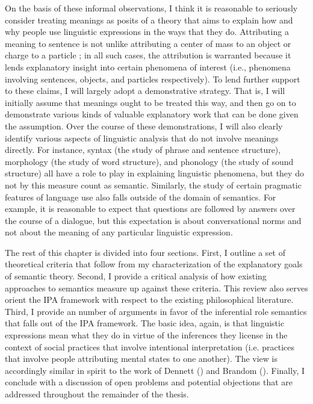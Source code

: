 On the basis of these informal observations, I think it is reasonable to seriously consider treating meanings as posits of a theory that aims to explain how and why people use linguistic expressions in the ways that they do. Attributing a meaning to sentence is not unlike attributing a center of mass to an object or charge to a particle \citep[see][]{Dennett:1987}; in all such cases, the attribution is warranted because it lends explanatory insight into certain phenomena of interest (i.e., phenomena involving sentences, objects, and particles respectively). To lend further support to these claims, I will largely adopt a demonstrative strategy. That is, I will initially assume that meanings ought to be treated this way, and then go on to demonstrate various kinds of valuable explanatory work that can be done given the assumption. Over the course of these demonstrations, I will also clearly identify various aspects of linguistic analysis that do not involve meanings directly. For instance, syntax (the study of phrase and sentence structure), morphology (the study of word structure), and phonology (the study of sound structure) all have a role to play in explaining linguistic phenomena, but they do not by this measure count as semantic. Similarly, the study of certain pragmatic features of language use also falls outside of the domain of semantics. For example, it is reasonable to expect that questions are followed by answers over the course of a dialogue, but this expectation is about conversational norms and not about the meaning of any particular linguistic expression.

The rest of this chapter is divided into four sections. First, I outline a set of theoretical criteria that follow from my characterization of the explanatory goals of semantic theory. Second, I provide a critical analysis of how existing approaches to semantics measure up against these criteria. This review also serves orient the IPA framework with respect to the existing philosophical literature. Third, I provide an number of arguments in favor of the inferential role semantics that falls out of the IPA framework. The basic idea, again, is that linguistic expressions mean what they do in virtue of the inferences they license in the context of social practices that involve intentional interpretation (i.e. practices that involve people attributing mental states to one another). The view is accordingly similar in spirit to the work of Dennett (\citeyear{Dennett:1987,Dennett:1991}) and Brandom (\citeyear{Brandom:1994,Brandom:2009,Brandom:2000}). Finally, I conclude with a discussion of open problems and potential objections that are addressed throughout the remainder of the thesis. 

